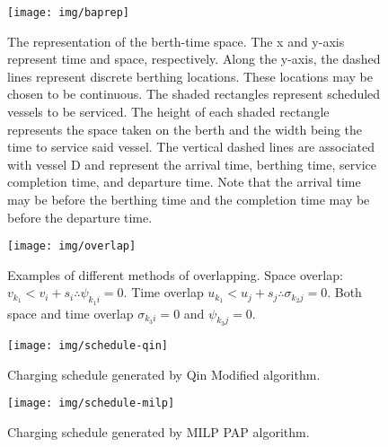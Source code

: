 \documentclass[utf8]{FrontiersinHarvard}
\begin{document}
\begin{figure}[ht]
\centering
    \texttt{[image: img/baprep]}
    \caption{The representation of the berth-time space. The x and y-axis represent time and space, respectively. Along
      the y-axis, the dashed lines represent discrete berthing locations. These locations may be chosen to be
      continuous. The shaded rectangles represent scheduled vessels to be serviced. The height of each shaded rectangle
      represents the space taken on the berth and the width being the time to service said vessel. The vertical dashed
      lines are associated with vessel D and represent the arrival time, berthing time, service completion time, and
      departure time. Note that the arrival time may be before the berthing time and the completion time may be before
      the departure time.}
    \label{fig:bap}
\end{figure}

\begin{figure}[htpb]
\centering
    \texttt{[image: img/overlap]}
    \caption{Examples of different methods of overlapping. Space overlap: $v_{k_1} < v_{i} + s_i \therefore \psi_{k_{1}i} = 0$.
             Time overlap $u_{k_1} < u_{j} + s_j \therefore \sigma_{k_{2}j} = 0$. Both space and time overlap $\sigma_{k_{3}i} = 0$ and
             $\psi_{k_{3}j} = 0$.}
    \label{fig:multipleassign}
\end{figure}

\begin{subfigures}
    \begin{figure}[htpb]
    \centering
        \texttt{[image: img/schedule-qin]}
        \caption{Charging schedule generated by Qin Modified algorithm.}
        \label{subfig:qin-schedule}
    \end{figure}

    \hfill

    \begin{figure}[htpb]
    \centering
        \texttt{[image: img/schedule-milp]}
        \caption{Charging schedule generated by MILP PAP algorithm.}
        \label{subfig:milp-schedule}
    \end{figure}
\end{subfigures}
\end{document}
